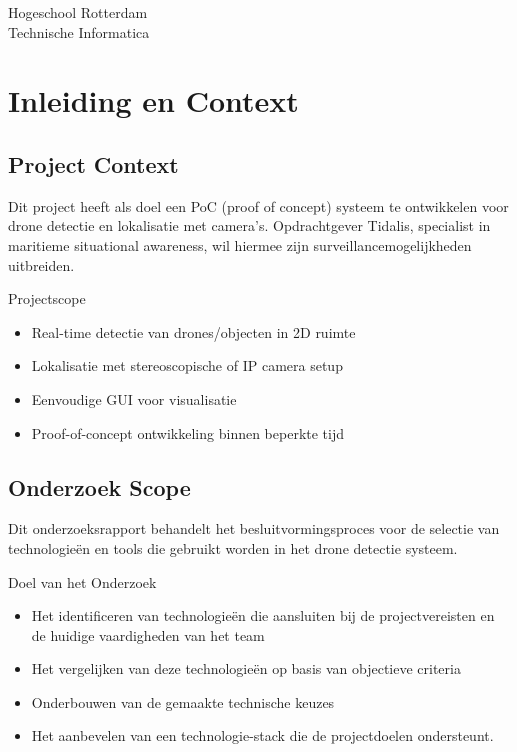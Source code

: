 \documentclass[11pt,a4paper]{scrartcl}
\begin{document}
\begin{titlepage}
    \vfill
    
    \begin{center}
        \color{darkgray}
        \sffamily
        Hogeschool Rotterdam\\
        Technische Informatica
    \end{center}
\end{titlepage}

\tableofcontents
\newpage

\section{Inleiding en Context}

\subsection{Project Context}
 Dit project heeft als doel een PoC (proof of concept) systeem te ontwikkelen voor drone detectie en lokalisatie met camera’s. Opdrachtgever Tidalis, specialist in maritieme situational awareness, wil hiermee zijn surveillancemogelijkheden uitbreiden.


\begin{infobox}{Projectscope}
\begin{itemize}[leftmargin=*]
    \item Real-time detectie van drones/objecten in 2D ruimte
    \item Lokalisatie met stereoscopische of IP camera setup
    \item Eenvoudige GUI voor visualisatie
    \item Proof-of-concept ontwikkeling binnen beperkte tijd
\end{itemize}
\end{infobox}


\subsection{Onderzoek Scope}
Dit onderzoeksrapport behandelt het besluitvormingsproces voor de selectie van technologieën en tools die gebruikt worden in het drone detectie systeem. 

\begin{infobox}{Doel van het Onderzoek}
\begin{itemize}[leftmargin=*]
    \item Het identificeren van technologieën die aansluiten bij de projectvereisten en de huidige vaardigheden van het team
    \item Het vergelijken van deze technologieën op basis van objectieve criteria
    \item Onderbouwen van de gemaakte technische keuzes
    \item Het aanbevelen van een technologie-stack die de projectdoelen ondersteunt.
   
\end{itemize}
\end{infobox}
\end{document}
